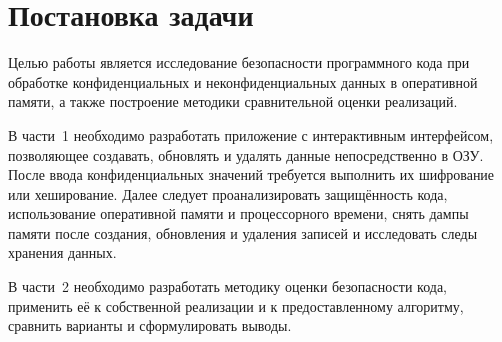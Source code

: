 \section{Постановка задачи}
\label{sec:task}

Целью работы является исследование безопасности программного кода при обработке конфиденциальных и неконфиденциальных данных в оперативной памяти, а также построение методики сравнительной оценки реализаций.

В части~1 необходимо разработать приложение с интерактивным интерфейсом, позволяющее создавать, обновлять и удалять данные непосредственно в ОЗУ. После ввода конфиденциальных значений требуется выполнить их шифрование или хеширование. Далее следует проанализировать защищённость кода, использование оперативной памяти и процессорного времени, снять дампы памяти после создания, обновления и удаления записей и исследовать следы хранения данных.

В части~2 необходимо разработать методику оценки безопасности кода, применить её к собственной реализации и к предоставленному алгоритму, сравнить варианты и сформулировать выводы.
